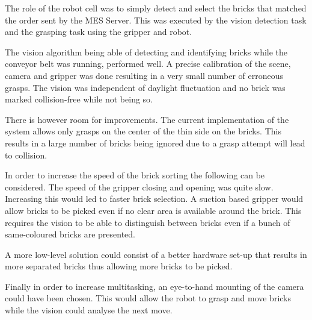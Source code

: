 	The role of the robot cell was to simply detect and select the bricks that matched the order sent by the MES Server. This was executed by the vision detection task and the grasping task using the gripper and robot. 

The vision algorithm being able of detecting and identifying bricks while the conveyor belt was running, performed well. A precise calibration of the scene, camera and gripper was done resulting in a very small number of erroneous grasps. The vision was independent of daylight fluctuation and no brick was marked collision-free while not being so.

There is however room for improvements. The current implementation of the system allows only grasps on the center of the thin side on the bricks. This results in a large number of bricks being ignored due to a grasp attempt will lead to collision. 

In order to increase the speed of the brick sorting the following can be considered. 
The speed of the gripper closing and opening was quite slow. Increasing this would led to faster brick selection. 
A suction based gripper would allow bricks to be picked even if no clear area is available around the brick. This requires the vision to be able to distinguish between bricks even if a bunch of same-coloured bricks are presented. 

A more low-level solution could consist of a better hardware set-up that results in more separated bricks thus allowing more bricks to be picked. 

Finally in order to increase multitasking, an eye-to-hand mounting of the camera could have been chosen. This would allow the robot to grasp and move bricks while the vision could analyse the next move. 

